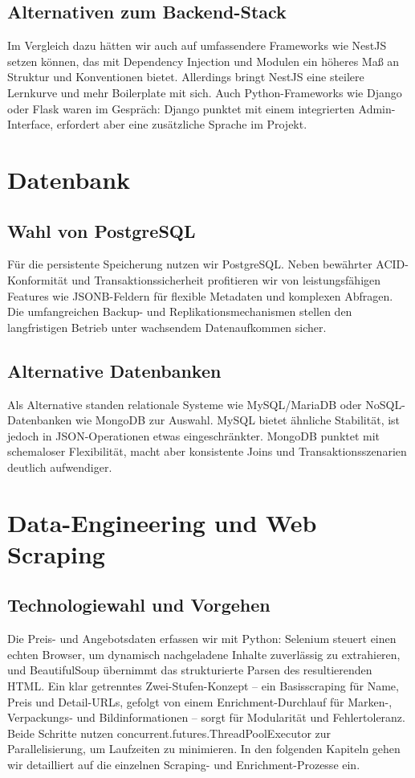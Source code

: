 \subsection{Alternativen zum Backend-Stack}
Im Vergleich dazu hätten wir auch auf umfassendere Frameworks wie NestJS setzen können, das mit Dependency Injection und Modulen ein höheres Maß an Struktur und Konventionen bietet. Allerdings bringt NestJS eine steilere Lernkurve und mehr Boilerplate mit sich. Auch Python-Frameworks wie Django oder Flask waren im Gespräch: Django punktet mit einem integrierten Admin-Interface, erfordert aber eine zusätzliche Sprache im Projekt.

\section{Datenbank}
\subsection{Wahl von PostgreSQL}
Für die persistente Speicherung nutzen wir PostgreSQL. Neben bewährter ACID-Konformität und Transaktions­sicherheit profitieren wir von leistungsfähigen Features wie JSONB-Feldern für flexible Metadaten und komplexen Abfragen. Die umfangreichen Backup- und Replikations­mechanismen stellen den langfristigen Betrieb unter wachsendem Datenaufkommen sicher.

\subsection{Alternative Datenbanken}
Als Alternative standen relationale Systeme wie MySQL/MariaDB oder NoSQL-Datenbanken wie MongoDB zur Auswahl. MySQL bietet ähnliche Stabilität, ist jedoch in JSON-Operationen etwas eingeschränkter. MongoDB punktet mit schemaloser Flexibilität, macht aber konsistente Joins und Transaktions­szenarien deutlich aufwendiger.

\section{Data-Engineering und Web Scraping}
\subsection{Technologiewahl und Vorgehen}
Die Preis- und Angebotsdaten erfassen wir mit Python: Selenium steuert einen echten Browser, um dynamisch nachgeladene Inhalte zuverlässig zu extrahieren, und BeautifulSoup übernimmt das strukturierte Parsen des resultierenden HTML. Ein klar getrenntes Zwei-Stufen-Konzept – ein Basisscraping für Name, Preis und Detail-URLs, gefolgt von einem Enrichment-Durchlauf für Marken-, Verpackungs- und Bildinformationen – sorgt für Modularität und Fehlertoleranz. Beide Schritte nutzen concurrent.futures.ThreadPoolExecutor zur Parallelisierung, um Laufzeiten zu minimieren. In den folgenden Kapiteln gehen wir detailliert auf die einzelnen Scraping- und Enrichment-Prozesse ein.

